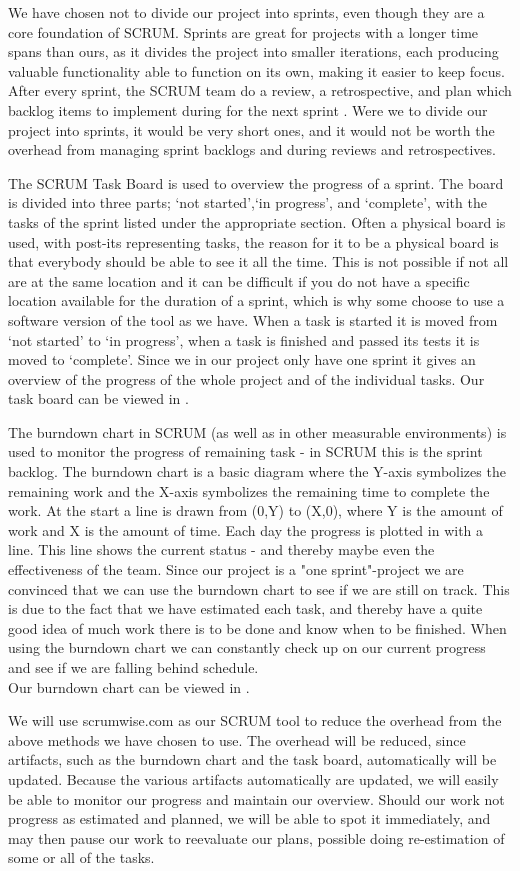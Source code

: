 We have chosen not to divide our project into sprints, even though they are a core foundation of SCRUM.
Sprints are great for projects with a longer time spans than ours, as it divides the project into smaller iterations, each producing valuable functionality able to function on its own, making it easier to keep focus.
After every sprint, the SCRUM team do a review, a retrospective, and plan which backlog items to implement during for the next sprint \cite[p. 8]{scrum-org-guide}.
Were we to divide our project into sprints, it would be very short ones, and it would not be worth the overhead from managing sprint backlogs and during reviews and retrospectives.

The SCRUM Task Board is used to overview the progress of a sprint. The board is divided into three parts; `not started',`in progress', and `complete', with the tasks of the sprint listed under the appropriate section. Often a physical board is used, with post-its representing tasks, the reason for it to be a physical board is that everybody should be able to see it all the time. This is not possible if not all are at the same location and it can be difficult if you do not have a specific location available for the duration of a sprint, which is why some choose to use a software version of the tool as we have. When a task is started it is moved from `not started' to `in progress', when a task is finished and passed its tests it is moved to `complete'. Since we in our project only have one sprint it gives an overview of the progress of the whole project and of the individual tasks.
Our task board can be viewed in .

The burndown chart in SCRUM (as well as in other measurable environments) is used to monitor the progress of remaining task - in SCRUM this is the sprint backlog.
The burndown chart is a basic diagram where the Y-axis symbolizes the remaining work and the X-axis symbolizes the remaining time to complete the work.
At the start a line is drawn from (0,Y) to (X,0), where Y is the amount of work and X is the amount of time.
Each day the progress is plotted in with a line. This line shows the current status - and thereby maybe even the effectiveness of the team.
Since our project is a "one sprint"-project we are convinced that we can use the burndown chart to see if we are still on track. This is due to the fact that we have estimated each task, and thereby have a quite good idea of much work there is to be done and know when to be finished. When using the burndown chart we can constantly check up on our current progress and see if we are falling behind schedule.\\
Our burndown chart can be viewed in .

We will use scrumwise.com as our SCRUM tool to reduce the overhead from the above methods we have chosen to use. The overhead will be reduced, since artifacts, such as the burndown chart and the task board, automatically will be updated.
Because the various artifacts automatically are updated, we will easily be able to monitor our progress and maintain our overview. Should our work not progress as estimated and planned, we will be able to spot it immediately, and may then pause our work to reevaluate our plans, possible doing re-estimation of some or all of the tasks.
